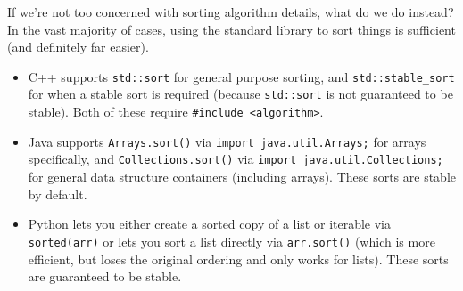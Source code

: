 If we're not too concerned with sorting algorithm details, what do we do instead? In the vast majority of cases, using the standard library to sort things is sufficient (and definitely far easier).
\begin{itemize}
\item C++ supports \texttt{std::sort} for general purpose sorting, and \texttt{std::stable_sort} for when a stable sort is required (because \texttt{std::sort} is not guaranteed to be stable). Both of these require \texttt{#include <algorithm>}.
\item Java supports \texttt{Arrays.sort()} via \texttt{import java.util.Arrays;} for arrays specifically, and \texttt{Collections.sort()} via \texttt{import java.util.Collections;} for general data structure containers (including arrays). These sorts are stable by default.
\item Python lets you either create a sorted copy of a list or iterable via \texttt{sorted(arr)} or lets you sort a list directly via \texttt{arr.sort()} (which is more efficient, but loses the original ordering and only works for lists). These sorts are guaranteed to be stable.
\end{itemize}

